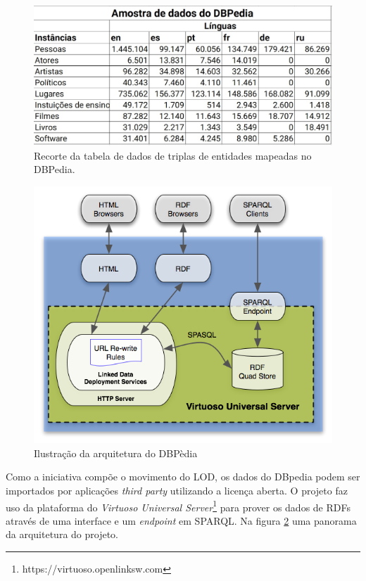 \begin{figure}
	\centering
	\includegraphics[scale=0.45]{imagens/dbpedia_triples.jpg}
	\caption{Recorte da tabela de dados de triplas de entidades mapeadas no DBPedia. \citep{DBPedia:2014}}
	\label{fig:dbpedia-triples}
\end{figure}

\begin{figure}
	\centering
	\includegraphics[scale=0.55]{imagens/dbpedia_virtuoso.png}
	\caption{Ilustração da arquitetura do DBPèdia \citep{DBPediaVirtuoso}}
	\label{fig:dbpedia-virtuoso}
\end{figure}

Como a iniciativa compõe o movimento do LOD, os dados do DBpedia podem ser importados por aplicações \textit{third party} utilizando a licença aberta. O projeto faz uso da plataforma do \textit{Virtuoso Universal Server}\footnote{https://virtuoso.openlinksw.com} para prover os dados de RDFs através de uma interface e um \textit{endpoint} em SPARQL. Na figura \ref{fig:dbpedia-virtuoso} uma panorama da arquitetura do projeto.

